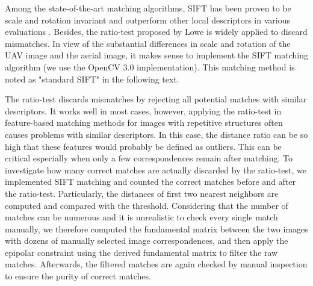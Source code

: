
Among the state-of-the-art matching algorithms, SIFT has been proven to be scale and rotation invariant and outperform other local descriptors in various  evaluations \cite{heinly2012comparative,bekele2013evaluation,dwarakanath2012evaluating,juan2009comparison}. Besides, the ratio-test proposed by Lowe \cite{lowe2004distinctive} is widely applied to discard mismatches. 
In view of the substantial differences in scale and rotation of the UAV image and the aerial image, it makes sense to implement the SIFT matching algorithm (we use the OpenCV 3.0 implementation).
This matching method is noted as "standard SIFT" in the following text.

The ratio-test discards mismatches by rejecting all potential matches with similar descriptors. It works well in most cases, however, applying the ratio-test in feature-based matching methods for images with repetitive structures often causes problems with similar descriptors. 
In this case, the distance ratio can be so high that these features would probably be defined as outliers.
This can be critical especially when only a few correspondences remain after matching.
To investigate how many correct matches are actually discarded by the ratio-test, we implemented SIFT matching and counted the correct matches before and after the ratio-test.
Particularly, the distances of first two nearest neighbors are computed and compared with the threshold. 
Considering that the number of matches can be numerous and it is unrealistic to check every single match manually, we therefore computed the fundamental matrix between the two images with dozens of manually selected image correspondences, and then apply the epipolar constraint using the derived fundamental matrix to filter the raw matches. 
Afterwards, the filtered matches are again checked by manual inspection to ensure the purity of correct matches.

